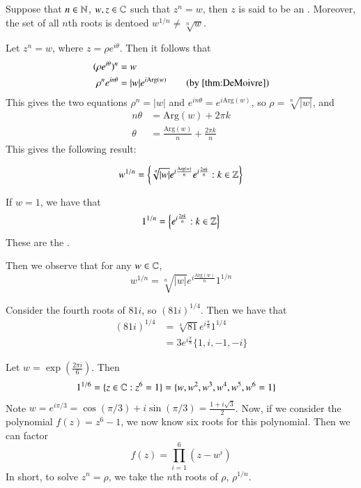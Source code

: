 \documentclass[12pt, a4paper, oneside, openright, titlepage]{book}
\begin{document}
\begin{defn}
    Suppose that $n \in \mathbb N$, $w,z \in \mathbb C$ such that $z^n = w$, then $z$ is said to be an . Moreover, the set of all $n$th roots is dentoed $w^{1/n} \neq \sqrt[n]{w}$.
\end{defn}

Let $z^n = w$, where $z = \rho e^{i\theta}$. Then it follows that \begin{align*}
    (\rho e^{i\theta})^n &= w \\
    \rho^ne^{in\theta} &= |w|e^{i\text{Arg}(w)} \tag{by \ref{thm:DeMoivre}}
\end{align*}
This gives the two equations $\rho^n = |w|$ and $e^{in\theta} = e^{i\text{Arg}(w)}$, so $\rho = \sqrt[n]{|w|}$, and \begin{align*}
    n\theta &= \text{Arg}(w)+2\pi k \\
    \theta &= \frac{\text{Arg}(w)}{n}+\frac{2\pi k}{n}
\end{align*}
This gives the following result: 
\begin{cor}
    $$w^{1/n} = \left\{\sqrt[n]{|w|}e^{i\frac{\text{Arg}(w)}{n}}e^{i\frac{2\pi k}{n}}: k \in \mathbb Z\right\}$$
\end{cor}
\begin{defn}
    If $w = 1$, we have that \begin{equation*}
        1^{1/n} = \left\{e^{i\frac{2\pi k}{n}}:k\in \mathbb Z\right\}
    \end{equation*}
    These are the .
\end{defn}

Then we observe that for any $w \in \mathbb C$, $$w^{1/n} = \sqrt[n]{|w|}e^{i\frac{\text{Arg}(w)}{n}}1^{1/n}$$


\begin{eg}
    Consider the fourth roots of $81i$, so $(81i)^{1/4}$. Then we have that \begin{align*}
        (81i)^{1/4} &= \sqrt[4]{81}e^{i\frac{\pi}{8}}1^{1/4} \\
        &= 3e^{i\frac{\pi}{8}}\{1,i,-1,-i\}
    \end{align*}
\end{eg}

\begin{eg}
    Let $w = \exp\left(\frac{2\pi i}{6}\right)$. Then \begin{align*}
        1^{1/6} &= \{z \in \mathbb C:z^6 = 1\} = \{w,w^2,w^3,w^4,w^5,w^6 = 1\}
    \end{align*}
    Note $w = e^{i\pi/3} = \cos(\pi/3)+i\sin(\pi/3) = \frac{1+i\sqrt{3}}{2}$. Now, if we consider the polynomial $f(z) = z^6 - 1$, we now know six roots for this polynomial. Then we can factor \begin{equation*}
        f(z) = \prod_{i=1}^6(z-w^i)
    \end{equation*}
    In short, to solve $z^n = \rho$, we take the $n$th roots of $\rho$, $\rho^{1/n}$. 
\end{eg}
\end{document}
